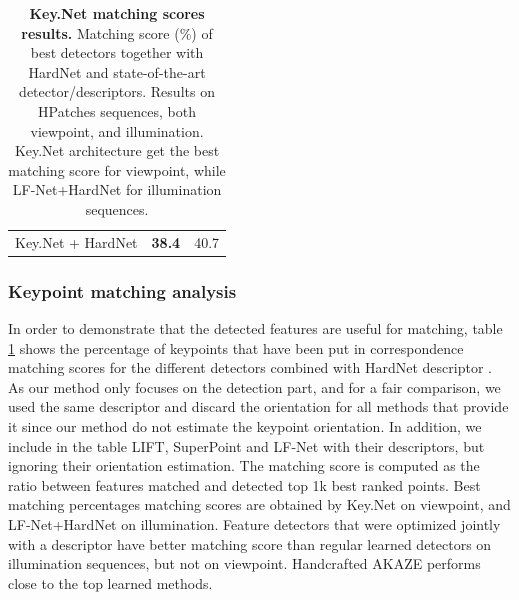 \begin{table}[!tbh]
\begin{center}
\begin{tabular}{lcc}
Key.Net + HardNet \cite{Mishchuk_Mishkin_NIPS17}      & \textbf{38.4} & 40.7 \\
\end{tabular}
\caption[Key.Net matching scores results]{\textbf{Key.Net matching scores results.} Matching score (\%) of best detectors together with HardNet and state-of-the-art detector/descriptors. Results on HPatches sequences, both viewpoint, and illumination. Key.Net architecture get the best matching score for viewpoint, while LF-Net+HardNet for illumination sequences.}
\label{table:matchingScore}
\end{center}
\end{table}


\subsubsection{Keypoint matching analysis}
In order to demonstrate that the detected features are useful for matching, table \ref{table:matchingScore} shows the percentage of keypoints that have been put in correspondence matching scores for the different detectors combined with HardNet  descriptor \cite{Mishchuk_Mishkin_NIPS17}. As our method only focuses on the detection part, and for a fair comparison, we used the same descriptor and discard the orientation for all methods that provide it since our method do not estimate the keypoint orientation. In addition, we include in the table  LIFT\cite{LIFT}, SuperPoint\cite{detone2017superpoint} and LF-Net\cite{OnoSerra18} with their descriptors, but ignoring their orientation estimation. The matching score is computed as the ratio between features matched and detected top 1k best ranked points. Best matching percentages matching scores are obtained by Key.Net on viewpoint, and LF-Net+HardNet on illumination. Feature detectors that were optimized jointly with a descriptor \cite{LIFT, detone2017superpoint, OnoSerra18} have better matching score than regular learned detectors on illumination sequences, but not on viewpoint. Handcrafted AKAZE performs close to the top learned methods.\par


